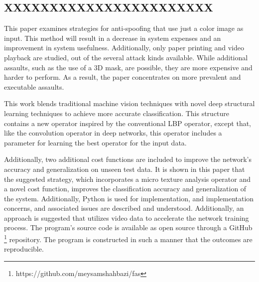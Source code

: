 \documentclass[journal]{IEEEtran}
\begin{document}
\subsection{XXXXXXXXXXXXXXXXXXXXXXX}
This paper examines strategies for anti-spoofing that use just a color image as input. This method will result in a decrease in system expenses and an improvement in system usefulness. Additionally, only paper printing and video playback are studied, out of the several attack kinds available. While additional assaults, such as the use of a 3D mask, are possible, they are more expensive and harder to perform. As a result, the paper concentrates on more prevalent and executable assaults.

This work blends traditional machine vision techniques with novel deep structural learning techniques to achieve more accurate classification. This structure contains a new operator inspired by the conventional LBP operator, except that, like the convolution operator in deep networks, this operator includes a parameter for learning the best operator for the input data.


Additionally, two additional cost functions are included to improve the network's accuracy and generalization on unseen test data. It is shown in this paper that the suggested strategy, which incorporates a micro texture analysis operator and a novel cost function, improves the classification accuracy and generalization of the system.
Additionally, Python is used for implementation, and implementation concerns, and associated issues are described and understood. Additionally, an approach is suggested that utilizes video data to accelerate the network training process. The program's source code is available as open source through a GitHub \footnote{https://github.com/meysamshahbazi/fas} repository. The program is constructed in such a manner that the outcomes are reproducible.
\end{document}
